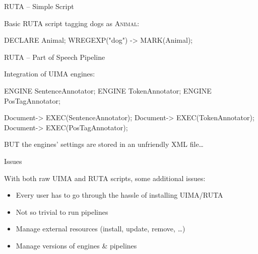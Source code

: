 \documentclass[10pt, compress, xcolor={usenames,dvipsnames}]{beamer}
\newcommand{\ID}[1]{{\textsc{#1}}}
\newcommand{\SmallArrow}{\ding{228}}
\renewcommand{\emph}[1]{\alert{#1}}
\begin{document}
\begin{frame}[fragile]{RUTA -- Simple Script}

  Basic RUTA script tagging dogs as \ID{Animal}:

  \vspace{1em}

  \begin{lstruta}
DECLARE Animal;
W{REGEXP("dog") -> MARK(Animal)};
  \end{lstruta}

\end{frame}

\begin{frame}[fragile]{RUTA -- Part of Speech Pipeline}

  Integration of UIMA engines:

  \vspace{1em}

  \begin{lstruta}
ENGINE SentenceAnnotator;
ENGINE TokenAnnotator;
ENGINE PosTagAnnotator;

Document{-> EXEC(SentenceAnnotator)};
Document{-> EXEC(TokenAnnotator)};
Document{-> EXEC(PosTagAnnotator)};
  \end{lstruta}

  \pause

  \emph{BUT} the engines' settings are stored in an unfriendly XML file\ldots

\end{frame}

\begin{frame}[fragile]{Issues}

  With both raw UIMA and RUTA scripts, some additional issues:

  \vspace{1em}

  \begin{itemize}[label=\SmallArrow, itemsep=1em]

    \item Every user has to go through the hassle of installing UIMA/RUTA

    \item Not so trivial to run pipelines

    \item Manage \emph{external resources} (install, update, remove, \ldots)

    \item Manage versions of engines \& pipelines

  \end{itemize}

\end{frame}
\end{document}

